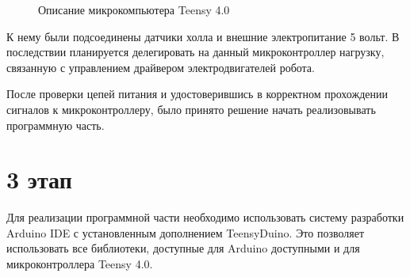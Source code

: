 \documentclass[12pt,a4paper]{scrartcl}
\begin{document}
			\begin{figure}[h]
				\caption{Описание микрокомпьютера Teensy 4.0}
				\label{fig:TeensyDesc}
			\end{figure}
			
			К нему были подсоединены датчики холла и внешние электропитание 5 вольт. В последствии планируется делегировать на данный микроконтроллер нагрузку, связанную с управлением драйвером электродвигателей робота.
			
			После проверки цепей питания и удостоверившись в корректном прохождении сигналов к микроконтроллеру, было принято решение начать реализовывать программную часть.
			
		\section*{3 этап}
			Для реализации программной части необходимо использовать систему разработки Arduino IDE с установленным дополнением TeensyDuino. Это позволяет использовать все библиотеки, доступные для Arduino доступными и для микроконтроллера Teensy 4.0. 
			
\end{document}
